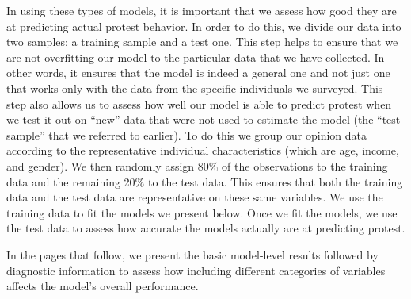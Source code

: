 

In using these types of models, it is important that we assess how good they are at predicting actual protest behavior. In order to do this, we divide our data into two samples: a training sample and a test one. This step helps to ensure that we are not overfitting our model to the particular data that we have collected. In other words, it ensures that the model is indeed a general one and not just one that works only with the data from the specific individuals we surveyed. This step also allows us to assess how well our model is able to predict protest when we test it out on ``new'' data that were not used to estimate the model (the ``test sample'' that we referred to earlier). To do this we group our opinion data according to the representative individual characteristics (which are age, income, and gender). We then randomly assign 80\% of the observations to the training data and the remaining 20\% to the test data. This ensures that both the training data and the test data are representative on these same variables. We use the training data to fit the models we present below. Once we fit the models, we use the test data to assess how accurate the models actually are at predicting protest.

In the pages that follow, we present the basic model-level results followed by diagnostic information to assess how including different categories of variables affects the model's overall performance. 